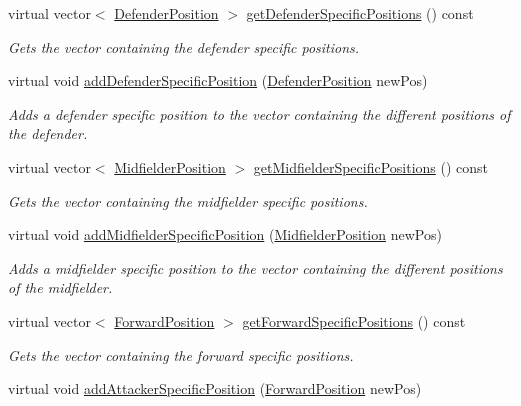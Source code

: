 \begin{DoxyCompactItemize}
virtual vector$<$ \hyperlink{_utils_8hpp_a94ee089ecd5db12c81c7edbefaabff4d}{Defender\+Position} $>$ \hyperlink{class_info_afa64d6a602f80674209e3391bf5fa309}{get\+Defender\+Specific\+Positions} () const
\begin{DoxyCompactList}\small\item\em Gets the vector containing the defender specific positions. \end{DoxyCompactList}\item 
virtual void \hyperlink{class_info_a33d98f07e5a276f9a3d0a08275f559b3}{add\+Defender\+Specific\+Position} (\hyperlink{_utils_8hpp_a94ee089ecd5db12c81c7edbefaabff4d}{Defender\+Position} new\+Pos)
\begin{DoxyCompactList}\small\item\em Adds a defender specific position to the vector containing the different positions of the defender. \end{DoxyCompactList}\item 
virtual vector$<$ \hyperlink{_utils_8hpp_a9f9328fe291d23e820ad594679abd217}{Midfielder\+Position} $>$ \hyperlink{class_info_afb5cbe001c15498897fc4852bd08c114}{get\+Midfielder\+Specific\+Positions} () const
\begin{DoxyCompactList}\small\item\em Gets the vector containing the midfielder specific positions. \end{DoxyCompactList}\item 
virtual void \hyperlink{class_info_ad90cc81b8a235763cf4127d90aa3a66a}{add\+Midfielder\+Specific\+Position} (\hyperlink{_utils_8hpp_a9f9328fe291d23e820ad594679abd217}{Midfielder\+Position} new\+Pos)
\begin{DoxyCompactList}\small\item\em Adds a midfielder specific position to the vector containing the different positions of the midfielder. \end{DoxyCompactList}\item 
virtual vector$<$ \hyperlink{_utils_8hpp_ae6ffae6f01bd3312aac4a44642f14620}{Forward\+Position} $>$ \hyperlink{class_info_abff2f6cd7a845b8bd80c97d9d456e07e}{get\+Forward\+Specific\+Positions} () const
\begin{DoxyCompactList}\small\item\em Gets the vector containing the forward specific positions. \end{DoxyCompactList}\item 
virtual void \hyperlink{class_info_afba094a1c19e8ff4bb3a9048ca6c7f4a}{add\+Attacker\+Specific\+Position} (\hyperlink{_utils_8hpp_ae6ffae6f01bd3312aac4a44642f14620}{Forward\+Position} new\+Pos)

\end{DoxyCompactItemize}
